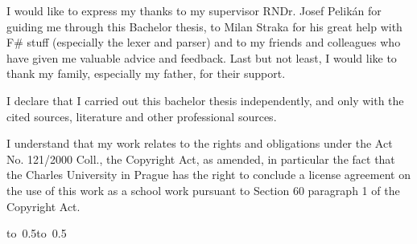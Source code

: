 
\noindent
I would like to express my thanks to my supervisor RNDr. Josef Pelikán for guiding me through this Bachelor thesis,
	to Milan Straka for his great help with F\# stuff (especially the lexer and parser)
	and to my friends and colleagues who have given me valuable advice and feedback.
Last but not least, I would like to thank my family, especially my father, for their support.


\vfill

\noindent
I declare that I carried out this bachelor thesis independently, and only with the cited
sources, literature and other professional sources.

\medskip\noindent
I understand that my work relates to the rights and obligations under the Act No.
121/2000 Coll., the Copyright Act, as amended, in particular the fact that the Charles
University in Prague has the right to conclude a license agreement on the use of this
work as a school work pursuant to Section 60 paragraph 1 of the Copyright Act.

\vspace{10mm}

\hbox{\hbox to 0.5\hbox to 0.5}

\vspace{20mm}










































